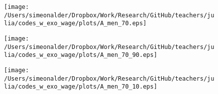 \documentclass[11pt]{beamer}
\begin{document}
\begin{frame}
\begin{figure}
\begin{center}
\texttt{[image: /Users/simeonalder/Dropbox/Work/Research/GitHub/teachers/julia/codes\_w\_exo\_wage/plots/A\_men\_70.eps]}
\label{ }
\end{center}
\end{figure}
\end{frame}

\begin{frame}
\begin{figure}
\begin{center}
\texttt{[image: /Users/simeonalder/Dropbox/Work/Research/GitHub/teachers/julia/codes\_w\_exo\_wage/plots/A\_men\_70\_90.eps]}
\label{ }
\end{center}
\end{figure}
\end{frame}

\begin{frame}
\begin{figure}
\begin{center}
\texttt{[image: /Users/simeonalder/Dropbox/Work/Research/GitHub/teachers/julia/codes\_w\_exo\_wage/plots/A\_men\_70\_10.eps]}
\label{ }
\end{center}
\end{figure}
\end{frame}
\end{document}
